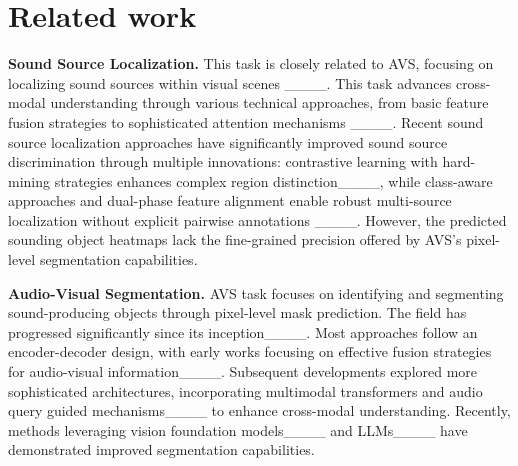 \section{Related work}
\label{sec:related_new}
\vspace{-4pt}


\textbf{Sound Source Localization.}
This task is closely related to AVS, focusing on localizing sound sources within visual scenes ____. This task advances cross-modal understanding through various technical approaches, from basic feature fusion strategies to sophisticated attention mechanisms ____.
Recent sound source localization approaches have significantly improved sound source discrimination through multiple innovations: contrastive learning with hard-mining strategies enhances complex region distinction____, while class-aware approaches and dual-phase feature alignment enable robust multi-source localization without explicit pairwise annotations ____.
However, the predicted sounding object heatmaps lack the fine-grained precision offered by AVS's pixel-level segmentation capabilities.


\vspace{2mm}
\noindent
\textbf{Audio-Visual Segmentation.}
AVS task focuses on identifying and segmenting sound-producing objects through pixel-level mask prediction. 
The field has progressed significantly since its inception____. Most approaches follow an encoder-decoder design, with early works focusing on effective fusion strategies for audio-visual information____. Subsequent developments explored more sophisticated architectures, incorporating multimodal transformers and audio query guided mechanisms____ to enhance cross-modal understanding. Recently, methods leveraging vision foundation models____ and LLMs____  have demonstrated improved segmentation capabilities. 

